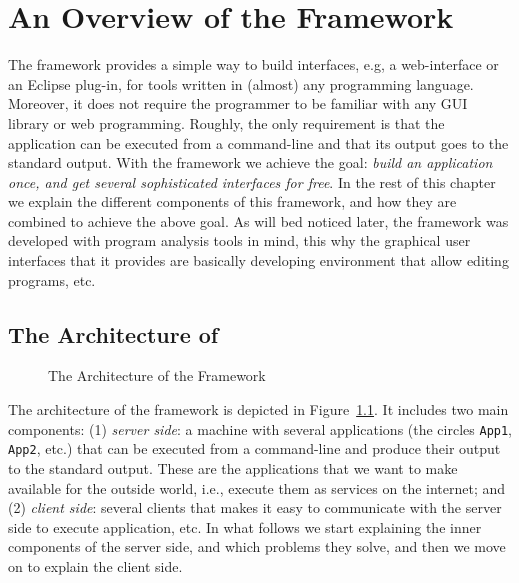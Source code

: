 {%
}


\chapter{An Overview of the \ei Framework}
\label{ch:overview}

The \ei framework provides a simple way to build interfaces, e.g, a
web-interface or an Eclipse plug-in, for tools written in (almost) any
programming language.
%
Moreover, it does not require the programmer to be familiar with any
GUI library or web programming. Roughly, the only requirement is that
the application can be executed from a command-line and that its
output goes to the standard output.
%
With the \ei framework we achieve the goal: \emph{build an application
  once, and get several sophisticated interfaces for free}.
%
In the rest of this chapter we explain the different components of
this framework, and how they are combined to achieve the above goal.
%
As will bed noticed later, the \ei framework was developed with
program analysis tools in mind, this why the graphical user interfaces
that it provides are basically developing environment that allow
editing programs, etc.

\section{The Architecture of \ei}
\label{ch:overview:arch}

\begin{figure}[h]
\begin{center}
\end{center}
\caption{The Architecture of the \ei Framework}
\label{fig:eiframework}
\end{figure}

The architecture of the \ei framework is depicted in
Figure~\ref{fig:eiframework}. It includes two main components:
%
(1) \emph{server side}: a machine with several applications (the
circles \texttt{App1}, \texttt{App2}, etc.) that can be executed from
a command-line and produce their output to the standard output. These
are the applications that we want to make available for the outside
world, i.e., execute them as services on the internet; and
%
(2) \emph{client side}: several clients that makes it easy to
  communicate with the server side to execute application, etc.
%
In what follows we start explaining the inner components of the server
side, and which problems they solve, and then we move on to explain the
client side.

